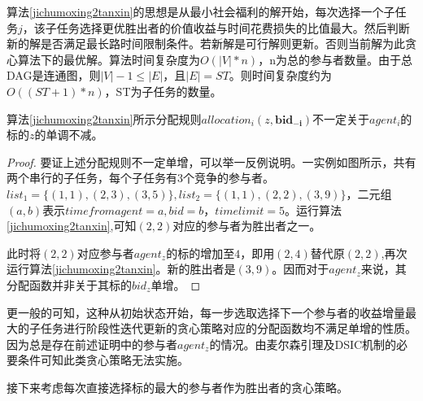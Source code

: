 \documentclass[promaster]{thesis-uestc}
\begin{document}
算法\ref{jichumoxing2tanxin}的思想是从最小社会福利的解开始，每次选择一个子任务$j$，该子任务选择更优胜出者的价值收益与时间花费损失的比值最大。然后判断新的解是否满足最长路时间限制条件。若新解是可行解则更新。否则当前解为此贪心算法下的最优解。算法时间复杂度为$O(|V|*n)$，n为总的参与者数量。由于总DAG是连通图，则$|V|- 1\leq |E|$，且$|E| = ST$。则时间复杂度约为$O((ST+1)*n)$，ST为子任务的数量。

\begin{theorem}
    算法\ref{jichumoxing2tanxin}所示分配规则$allocation_i(z,\mathbf{bid_{-i}})$不一定关于$agent_i$的标的$z$的单调不减。
\end{theorem}

\begin{proof}
    要证上述分配规则不一定单增，可以举一反例说明。一实例如图所示，共有两个串行的子任务，每个子任务有$3$个竞争的参与者。$list_1=\{(1,1),(2,3),(3,5)\},list_2=\{(1,1),(2,2),(3,9)\}$，二元组$(a,b)$表示$timefromagent=a,bid=b$，$timelimit=5$。运行算法\ref{jichumoxing2tanxin},可知$(2,2)$对应的参与者为胜出者之一。

    此时将$(2,2)$对应参与者$agent_z$的标的增加至$4$，即用$(2,4)$替代原$(2,2)$,再次运行算法\ref{jichumoxing2tanxin}。新的胜出者是$(3,9)$。因而对于$agent_z$来说，其分配函数并非关于其标的$bid_z$单增。
\end{proof}

更一般的可知，这种从初始状态开始，每一步选取选择下一个参与者的收益增量最大的子任务进行阶段性迭代更新的贪心策略对应的分配函数均不满足单增的性质。因为总是存在前述证明中的参与者$agent_z$的情况。由麦尔森引理及DSIC机制的必要条件可知此类贪心策略无法实施。

接下来考虑每次直接选择标的最大的参与者作为胜出者的贪心策略。
\end{document}
